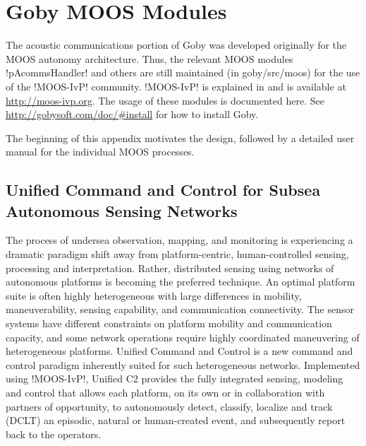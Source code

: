 \chapter{Goby MOOS Modules}\label{chap:MOOS}
\MakeShortVerb{\!} %

The acoustic communications portion of Goby was developed originally for the MOOS autonomy architecture. Thus, the relevant MOOS modules !pAcommsHandler! and others are still maintained (in goby/src/moos) for the use of the !MOOS-IvP! community. !MOOS-IvP! is explained in \cite{moos-ivp-jfr} and is available at \url{http://moos-ivp.org}. The usage of these modules is documented here. See \url{http://gobysoft.com/doc/#install} for how to install Goby.

The beginning of this appendix motivates the design, followed by a detailed user manual for the individual MOOS processes.

\section{Unified Command and Control for Subsea Autonomous Sensing Networks}

The process of undersea observation, mapping, and monitoring is experiencing a dramatic
paradigm shift away from platform-centric, human-controlled sensing,
processing and interpretation. Rather, distributed sensing
using networks of autonomous platforms is becoming the preferred technique.
An optimal platform suite is often highly heterogeneous with large differences in mobility,
maneuverability, sensing capability, and communication connectivity.  The
sensor systems have different constraints on platform mobility and
communication capacity, and some network operations require highly
coordinated maneuvering of heterogeneous platforms. Unified Command and Control \cite{unified_c2} is a new command and control paradigm inherently suited for such heterogeneous networks. Implemented using
!MOOS-IvP!, Unified C2 provides the fully integrated sensing,
modeling and control that allows each platform, on its own or in
collaboration with partners of opportunity, to autonomously detect,
classify, localize and track (DCLT) an episodic, natural or human-created event, and
subsequently report back to the operators.

